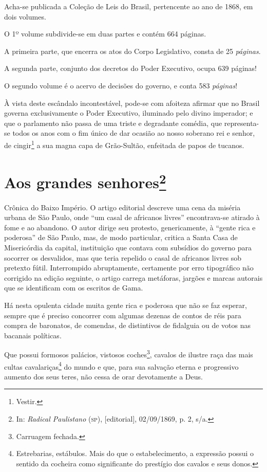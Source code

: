 Acha-se publicada a Coleção de Leis do Brasil, pertencente ao ano de
1868, em dois volumes.

O 1º volume subdivide-se em duas partes e contém 664 páginas.

A primeira parte, que encerra os atos do Corpo Legislativo, consta de 25
\emph{páginas}.

A segunda parte, conjunto dos decretos do Poder Executivo, ocupa 639
páginas!

O segundo volume é o acervo de decisões do governo, e conta 583
\emph{páginas}!

À vista deste escândalo incontestável, pode-se com afoiteza afirmar que
no Brasil governa exclusivamente o Poder Executivo, iluminado pelo
divino imperador; e que o parlamento não passa de uma triste e
degradante comédia, que representa-se todos os anos com o fim único de
dar ocasião ao nosso soberano rei e senhor, de cingir\footnote{Vestir.}
a sua magna capa de Grão-Sultão, enfeitada de papos de tucanos.

\chapter{Aos grandes senhores\footnote{In: \emph{Radical Paulistano} (\textsc{sp}),
  {[}editorial{]}, 02/09/1869, p. 2, s/a.}}

\begin{didascalia}
Crônica do Baixo Império. O artigo editorial descreve uma cena da
miséria urbana de São Paulo, onde ``um casal de africanos livres''
encontrava-se atirado à fome e ao abandono. O autor dirige seu protesto,
genericamente, à ``gente rica e poderosa'' de São Paulo, mas, de modo
particular, critica a Santa Casa de Misericórdia da capital, instituição
que contava com subsídios do governo para socorrer os desvalidos, mas
que teria repelido o casal de africanos livres sob pretexto fútil.
Interrompido abruptamente, certamente por erro tipográfico não corrigido
na edição seguinte, o artigo carrega metáforas, jargões e marcas
autorais que se identificam com os escritos de Gama.
\end{didascalia}



Há nesta opulenta cidade muita gente rica e poderosa que não se faz
esperar, sempre que é preciso concorrer com algumas dezenas de contos de
réis para compra de baronatos, de comendas, de distintivos de fidalguia
ou de votos nas bacanais políticas.

Que possui formosos palácios, vistosos coches\footnote{Carruagem
  fechada.}, cavalos de ilustre raça das mais cultas
cavalariças\footnote{Estrebarias, estábulos. Mais do que o
  estabelecimento, a expressão possui o sentido da cocheira como
  significante do prestígio dos cavalos e seus donos.} do mundo e que,
para sua salvação eterna e progressivo aumento dos seus teres, não cessa
de orar devotamente a Deus.

